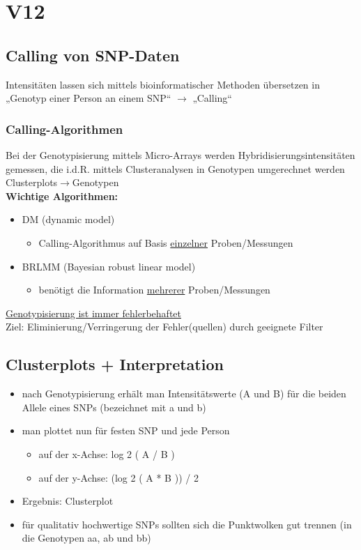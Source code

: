 \section{V12}
\subsection{Calling von SNP-Daten}
Intensitäten lassen sich mittels bioinformatischer Methoden übersetzen in „Genotyp einer Person an einem SNP“ $\rightarrow$ „Calling“
\subsubsection{Calling-Algorithmen}
Bei der Genotypisierung mittels Micro-Arrays werden Hybridisierungsintensitäten gemessen, die i.d.R. mittels Clusteranalysen in Genotypen umgerechnet werden\\
Clusterplots$\rightarrow$Genotypen\\
\textbf{Wichtige Algorithmen:}
\begin{itemize}
	\item DM (dynamic model)
	\begin{itemize}
		\item Calling-Algorithmus auf Basis \underline{einzelner} Proben/Messungen
	\end{itemize}
	\item BRLMM (Bayesian robust linear model)
	\begin{itemize}
		\item benötigt die Information \underline{mehrerer} Proben/Messungen
	\end{itemize}
\end{itemize}

\underline{Genotypisierung ist immer fehlerbehaftet}\\
Ziel: Eliminierung/Verringerung der Fehler(quellen) durch geeignete Filter

\subsection{Clusterplots + Interpretation}
\begin{itemize}
	\item nach Genotypisierung erhält man Intensitätswerte (A und B) für die beiden Allele eines SNPs (bezeichnet mit a und b)
	\item man plottet nun für festen SNP und jede Person
	\begin{itemize}
		\item auf der x-Achse: log 2 ( A / B )
		\item auf der y-Achse: (log 2 ( A * B )) / 2
	\end{itemize}
	\item Ergebnis: Clusterplot
	\item für qualitativ hochwertige SNPs sollten sich die Punktwolken gut trennen (in die Genotypen aa, ab und bb)
\end{itemize}

